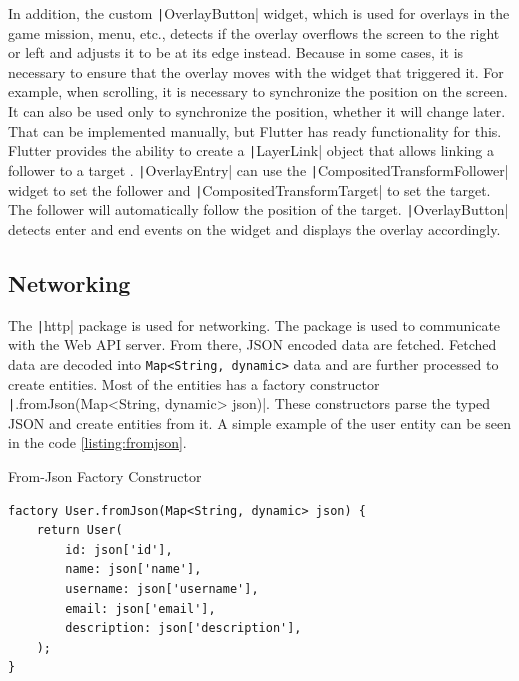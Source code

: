 In addition, the custom \texttt|OverlayButton| widget, which is used for overlays in the game mission, menu, etc., detects if the overlay overflows the screen to the right or left and adjusts it to be at its edge instead.
Because in some cases, it is necessary to ensure that the overlay moves with the widget that triggered it.
For example, when scrolling, it is necessary to synchronize the position on the screen.
It can also be used only to synchronize the position, whether it will change later.
That can be implemented manually, but Flutter has ready functionality for this.
Flutter provides the ability to create a \texttt|LayerLink| object that allows linking a follower to a target \cite{a2022_material}.
\texttt|OverlayEntry| can use the \texttt|CompositedTransformFollower| widget to set the follower and \texttt|CompositedTransformTarget| to set the target.
The follower will automatically follow the position of the target.
\texttt|OverlayButton| detects enter and end events on the widget and displays the overlay accordingly.

\subsection{Networking}

The \texttt|http| package is used for networking.
The package is used to communicate with the Web API server.
From there, JSON encoded data are fetched.
Fetched data are decoded into \texttt{Map<String, dynamic>} data and are further processed to create entities.
Most of the entities has a factory constructor \texttt|.fromJson(Map<String, dynamic> json)|.
These constructors parse the typed JSON and create entities from it.
A simple example of the user entity can be seen in the code \ref{listing:fromjson}.

\begin{listing}
    \caption{From-Json Factory Constructor}
    \label{listing:fromjson}
    \begin{verbatim}
factory User.fromJson(Map<String, dynamic> json) {
    return User(
        id: json['id'],
        name: json['name'],
        username: json['username'],
        email: json['email'],
        description: json['description'],
    );
}
    \end{verbatim}
\end{listing}

